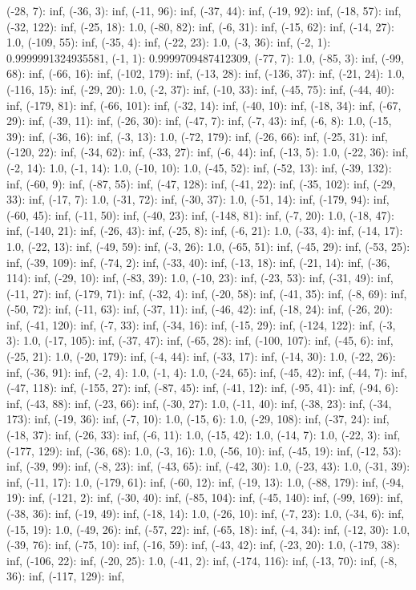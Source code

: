 \documentclass[parskip=half]{scrartcl}
\begin{document}
(-28, 7): inf, (-36, 3): inf, (-11, 96): inf, (-37, 44): inf, (-19, 92): inf, (-18, 57): inf, (-32, 122): inf, (-25, 18): 1.0, (-80, 82): inf, (-6, 31): inf, (-15, 62): inf, (-14, 27): 1.0, (-109, 55): inf, (-35, 4): inf, (-22, 23): 1.0, (-3, 36): inf, (-2, 1): 0.9999991324935581, (-1, 1): 0.9999709487412309, (-77, 7): 1.0, (-85, 3): inf, (-99, 68): inf, (-66, 16): inf, (-102, 179): inf, (-13, 28): inf, (-136, 37): inf, (-21, 24): 1.0, (-116, 15): inf, (-29, 20): 1.0, (-2, 37): inf, (-10, 33): inf, (-45, 75): inf, (-44, 40): inf, (-179, 81): inf, (-66, 101): inf, (-32, 14): inf, (-40, 10): inf, (-18, 34): inf, (-67, 29): inf, (-39, 11): inf, (-26, 30): inf, (-47, 7): inf, (-7, 43): inf, (-6, 8): 1.0, (-15, 39): inf, (-36, 16): inf, (-3, 13): 1.0, (-72, 179): inf, (-26, 66): inf, (-25, 31): inf, (-120, 22): inf, (-34, 62): inf, (-33, 27): inf, (-6, 44): inf, (-13, 5): 1.0, (-22, 36): inf, (-2, 14): 1.0, (-1, 14): 1.0, (-10, 10): 1.0, (-45, 52): inf, (-52, 13): inf, (-39, 132): inf, (-60, 9): inf, (-87, 55): inf, (-47, 128): inf, (-41, 22): inf, (-35, 102): inf, (-29, 33): inf, (-17, 7): 1.0, (-31, 72): inf, (-30, 37): 1.0, (-51, 14): inf, (-179, 94): inf, (-60, 45): inf, (-11, 50): inf, (-40, 23): inf, (-148, 81): inf, (-7, 20): 1.0, (-18, 47): inf, (-140, 21): inf, (-26, 43): inf, (-25, 8): inf, (-6, 21): 1.0, (-33, 4): inf, (-14, 17): 1.0, (-22, 13): inf, (-49, 59): inf, (-3, 26): 1.0, (-65, 51): inf, (-45, 29): inf, (-53, 25): inf, (-39, 109): inf, (-74, 2): inf, (-33, 40): inf, (-13, 18): inf, (-21, 14): inf, (-36, 114): inf, (-29, 10): inf, (-83, 39): 1.0, (-10, 23): inf, (-23, 53): inf, (-31, 49): inf, (-11, 27): inf, (-179, 71): inf, (-32, 4): inf, (-20, 58): inf, (-41, 35): inf, (-8, 69): inf, (-50, 72): inf, (-11, 63): inf, (-37, 11): inf, (-46, 42): inf, (-18, 24): inf, (-26, 20): inf, (-41, 120): inf, (-7, 33): inf, (-34, 16): inf, (-15, 29): inf, (-124, 122): inf, (-3, 3): 1.0, (-17, 105): inf, (-37, 47): inf, (-65, 28): inf, (-100, 107): inf, (-45, 6): inf, (-25, 21): 1.0, (-20, 179): inf, (-4, 44): inf, (-33, 17): inf, (-14, 30): 1.0, (-22, 26): inf, (-36, 91): inf, (-2, 4): 1.0, (-1, 4): 1.0, (-24, 65): inf, (-45, 42): inf, (-44, 7): inf, (-47, 118): inf, (-155, 27): inf, (-87, 45): inf, (-41, 12): inf, (-95, 41): inf, (-94, 6): inf, (-43, 88): inf, (-23, 66): inf, (-30, 27): 1.0, (-11, 40): inf, (-38, 23): inf, (-34, 173): inf, (-19, 36): inf, (-7, 10): 1.0, (-15, 6): 1.0, (-29, 108): inf, (-37, 24): inf, (-18, 37): inf, (-26, 33): inf, (-6, 11): 1.0, (-15, 42): 1.0, (-14, 7): 1.0, (-22, 3): inf, (-177, 129): inf, (-36, 68): 1.0, (-3, 16): 1.0, (-56, 10): inf, (-45, 19): inf, (-12, 53): inf, (-39, 99): inf, (-8, 23): inf, (-43, 65): inf, (-42, 30): 1.0, (-23, 43): 1.0, (-31, 39): inf, (-11, 17): 1.0, (-179, 61): inf, (-60, 12): inf, (-19, 13): 1.0, (-88, 179): inf, (-94, 19): inf, (-121, 2): inf, (-30, 40): inf, (-85, 104): inf, (-45, 140): inf, (-99, 169): inf, (-38, 36): inf, (-19, 49): inf, (-18, 14): 1.0, (-26, 10): inf, (-7, 23): 1.0, (-34, 6): inf, (-15, 19): 1.0, (-49, 26): inf, (-57, 22): inf, (-65, 18): inf, (-4, 34): inf, (-12, 30): 1.0, (-39, 76): inf, (-75, 10): inf, (-16, 59): inf, (-43, 42): inf, (-23, 20): 1.0, (-179, 38): inf, (-106, 22): inf, (-20, 25): 1.0, (-41, 2): inf, (-174, 116): inf, (-13, 70): inf, (-8, 36): inf, (-117, 129): inf, 
\end{document}
